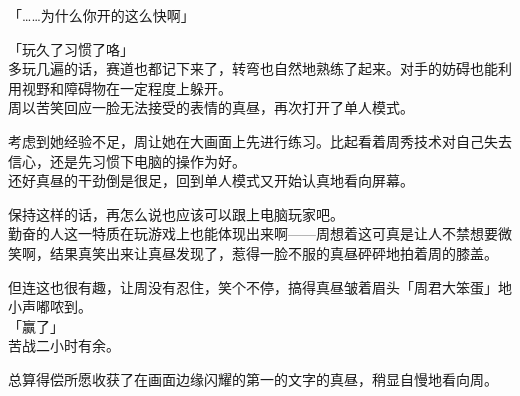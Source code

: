 「……为什么你开的这么快啊」

「玩久了习惯了咯」\\

多玩几遍的话，赛道也都记下来了，转弯也自然地熟练了起来。对手的妨碍也能利用视野和障碍物在一定程度上躲开。\\

周以苦笑回应一脸无法接受的表情的真昼，再次打开了单人模式。

考虑到她经验不足，周让她在大画面上先进行练习。比起看着周秀技术对自己失去信心，还是先习惯下电脑的操作为好。\\

还好真昼的干劲倒是很足，回到单人模式又开始认真地看向屏幕。

保持这样的话，再怎么说也应该可以跟上电脑玩家吧。\\

勤奋的人这一特质在玩游戏上也能体现出来啊——周想着这可真是让人不禁想要微笑啊，结果真笑出来让真昼发现了，惹得一脸不服的真昼砰砰地拍着周的膝盖。

但连这也很有趣，让周没有忍住，笑个不停，搞得真昼皱着眉头「周君大笨蛋」地小声嘟哝到。\\



「赢了」\\

苦战二小时有余。

总算得偿所愿收获了在画面边缘闪耀的第一的文字的真昼，稍显自慢地看向周。\\

